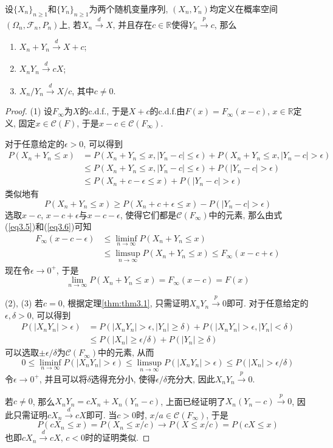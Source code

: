 \documentclass[cn, 12pt, math=mtpro2, bibstyle=apa, blue, twocol]{elegantbook}
\newcommand{\F}{\mathcal{F}}
\newcommand{\R}{\mathbb{R}}
\newcommand{\limn}{\lim_{n\to\infty}}
\begin{document}
\begin{theorem}[Slutsky定理]
  设$\{X_n\}_{n\ge1}$和$\{Y_n\}_{n\ge1}$为两个随机变量序列, $(X_n,Y_n)$均定义在概率空间$(\Omega_n,\F_n,P_n)$上, 若$X_n\xrightarrow{d} X$, 并且存在$c\in\R$使得$Y_n\xrightarrow{p}c$, 那么
  \begin{enumerate}[label=(\arabic*)]
    \item $X_n+Y_n\xrightarrow{d}X+c$;
    \item $X_nY_n\xrightarrow{d}cX$;
    \item $X_n/Y_n\xrightarrow{d}X/c$, 其中$c\ne0$.
  \end{enumerate}
\end{theorem}
\begin{proof}
  (1) 设$F_\infty$为$X$的c.d.f., 于是$X+c$的c.d.f.由$F(x)=F_\infty(x-c)$, $x\in\R$定义, 固定$x\in\mathcal{C}(F)$, 于是$x-c\in\mathcal{C}(F_\infty)$.

  对于任意给定的$\epsilon>0$, 可以得到
  \begin{align}
  P(X_n+Y_n\leq x)&=P(X_n+Y_n\leq x, |Y_n-c|\leq\epsilon)+P(X_n+Y_n\leq x, |Y_n-c|>\epsilon) \nonumber \\
  &\leq P(X_n+Y_n\leq x, |Y_n-c|\leq\epsilon)+P(|Y_n-c|>\epsilon) \nonumber \\
  &\leq P(X_n+c-\epsilon\leq x)+P(|Y_n-c|>\epsilon) \label{eq3.5}
  \end{align}
  类似地有
  \begin{equation}\label{eq3.6}
    P(X_n+Y_n\leq x)\geq P(X_n+c+\epsilon\leq x)-P(|Y_n-c|>\epsilon)
  \end{equation}
  选取$x-c$, $x-c+\epsilon$与$x-c-\epsilon$, 使得它们都是$\mathcal{C}(F_\infty)$中的元素, 那么由式(\ref{eq3.5})和(\ref{eq3.6})可知
  \begin{align*}
  F_\infty(x-c-\epsilon)&\leq\liminf_{n\to\infty}P(X_n+Y_n\leq x) \\
  &\leq\limsup_{n\to\infty}P(X_n+Y_n\leq x)\leq F_\infty(x-c+\epsilon)
  \end{align*}
  现在令$\epsilon\to0^+$, 于是
  $$\limn P(X_n+Y_n\leq x)=F_\infty(x-c)=F(x)$$

  (2), (3) 若$c=0$, 根据定理\ref{thm:thm3.1}, 只需证明$X_nY_n\xrightarrow{p}0$即可. 对于任意给定的$\epsilon, \delta>0$, 可以得到
  \begin{align*}
  P(|X_nY_n|>\epsilon)&=P(|X_nY_n|>\epsilon, |Y_n|\geq\delta)+P(|X_nY_n|>\epsilon, |Y_n|<\delta) \\
  &\leq P(|X_n|\geq\epsilon/\delta)+P(|Y_n|\geq\delta)
  \end{align*}
  可以选取$\pm\epsilon/\delta$为$\mathcal{C}(F_\infty)$中的元素, 从而
  $$0\leq\liminf_{n\to\infty}P(|X_nY_n|>\epsilon)\leq\limsup_{n\to\infty}P(|X_nY_n|>\epsilon)\leq P(|X_n|>\epsilon/\delta)$$
  令$\epsilon\to0^+$, 并且可以将$\delta$选得充分小, 使得$\epsilon/\delta$充分大, 因此$X_nY_n\xrightarrow{p}0$.

  若$c\neq0$, 那么$X_nY_n=cX_n+X_n(Y_n-c)$, 上面已经证明了$X_n(Y_n-c)\xrightarrow{p}0$, 因此只需证明$cX_n\xrightarrow{d}cX$即可. 当$c>0$时, $x/a\in\mathcal{C}(F_\infty)$, 于是
  $$P(cX_n\leq x)=P(X_n\leq x/c)\to P(X\leq x/c)=P(cX\leq x)$$
  也即$cX_n\xrightarrow{d}cX$, $c<0$时的证明类似.

\end{proof}
\end{document}
